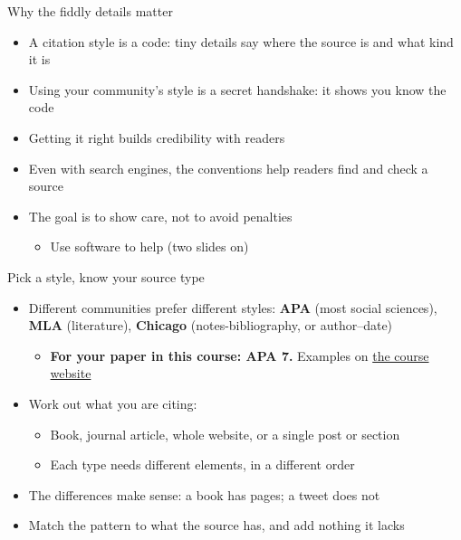 \documentclass[aspectratio=169]{beamer}
\begin{document}
\begin{frame}{Why the fiddly details matter}
\begin{itemize}
  \item A citation style is a code: tiny details say where the source is and what kind it is
  \item Using your community's style is a secret handshake: it shows you know the code
  \item Getting it right builds credibility with readers
  \item Even with search engines, the conventions help readers find and check a source
  \item The goal is to show care, not to avoid penalties
    \begin{itemize}
    \item Use software to help (two slides on)
    \end{itemize}
\end{itemize}
\end{frame}

\begin{frame}{Pick a style, know your source type}
\begin{itemize}
  \item Different communities prefer different styles: \textbf{APA} (most
    social sciences), \textbf{MLA} (literature), \textbf{Chicago}
    (notes-bibliography, or author--date)
    \begin{itemize}
    \item \textbf{For your paper in this course: APA 7.}  Examples on
      \href{https://bond-lab.github.io/Open-Knowledge/}{the course website}
    \end{itemize}
  \item Work out what you are citing:
    \begin{itemize}
      \item Book, journal article, whole website, or a single post or section
      \item Each type needs different elements, in a different order
    \end{itemize}
  \item The differences make sense: a book has pages; a tweet does not
  \item Match the pattern to what the source has, and add nothing it lacks
\end{itemize}
\end{frame}
\end{document}

